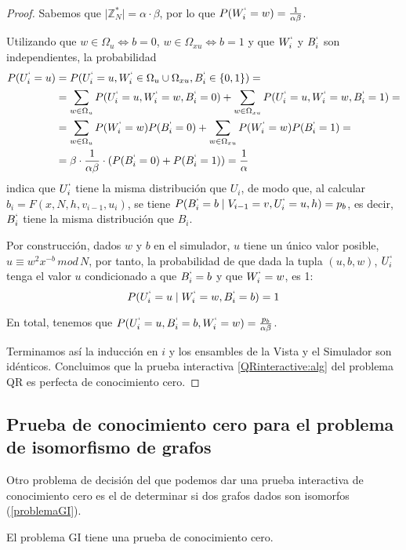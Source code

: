 \begin{proof}
	Sabemos que $\mid \mathbb{Z}^*_N \mid = \alpha \cdot \beta $, por lo que $P(W_i^`=w) = \frac{1}{\alpha \beta}$.
	
	Utilizando que $w\in \Omega_u \Leftrightarrow b=0$, $w\in \Omega_{xu} \Leftrightarrow b=1$ y que $W_i^`$ y $B_i^`$ son independientes, la probabilidad
	\begin{align*}
	P(U_i^`=u)  & = P(U_i^`=u, W_i^`\in \Omega_u \cup \Omega_{xu}, B_i^` \in \{0,1\}) = \\
				&= \sum_{w\in \Omega_u} P(U_i^`=u, W_i^`=w, B_i^` = 0) + \sum_{w\in \Omega_{xu}} P(U_i^`=u, W_i^`=w, B_i^` = 1) =  \\
				&= \sum_{w\in \Omega_u} P(W_i^`=w)P(B_i^` = 0) + \sum_{w\in \Omega_{xu}} P(W_i^`=w)P(B_i^` = 1) = \\
				&=\beta \cdot \frac{1}{\alpha \beta} \cdot (P(B_i^`=0) + P(B_i^`=1)) = \frac{1}{\alpha}
	\end{align*}
	indica que $U_i^`$ tiene la misma distribución que $U_i$, de modo que, al calcular $b_{i} = F(x,N,h,v_{i-1},u_{i})$, se tiene 
	$P(B_i^`=b \mid V_{i-1}=v, U_i^`=u,h) = p_b$, es decir, $B_i^`$ tiene la misma distribución que $B_i$.
	
	Por construcción, dados $w$ y $b$ en el simulador, $u$ tiene un único valor posible, $u\equiv w^2x^{-b}\,mod\,N$, por tanto, la probabilidad de que dada la tupla $(u, b, w)$, $U_i^`$ tenga el valor $u$ condicionado a que $ B_i^`=b$ y que $W_i^`=w$, es 1:
	\[P(U_i^`=u \mid W_i^`=w, B_i^`=b) = 1\]
	
	En total, tenemos que $P(U_i^`=u, B_i^`=b, W_i^`=w) = \frac{p_b}{\alpha \beta}$.
	
	
	Terminamos así la inducción en $i$ y los ensambles de la Vista y el Simulador son idénticos. Concluimos que la prueba interactiva \ref{QRinteractive:alg} del problema QR es perfecta de conocimiento cero.
	
\end{proof}



\subsection{Prueba de conocimiento cero para el problema de isomorfismo de grafos}


Otro problema de decisión del que podemos dar una prueba interactiva de conocimiento cero es el de determinar si dos grafos dados son isomorfos (\autoref{problemaGI}).


\begin{theorem}
	El problema GI tiene una prueba de conocimiento cero.
\end{theorem}


